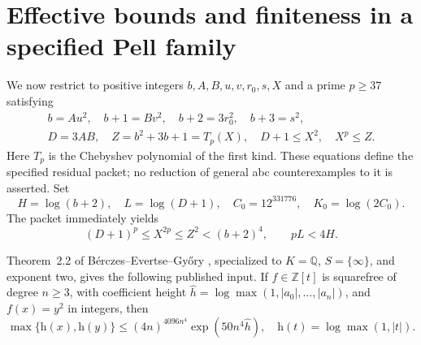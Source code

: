 \documentclass[11pt]{amsart}
\theoremstyle{definition}
\theoremstyle{remark}
\newcommand{\Q}{\mathbb Q}
\newcommand{\Z}{\mathbb Z}
\newcommand{\height}{\mathrm h}
\begin{document}
\section{Effective bounds and finiteness in a specified Pell family}\label{sec:pell}

We now restrict to positive integers $b,A,B,u,v,r_0,s,X$ and a prime
$p\ge37$ satisfying
\begin{align}
 b=Au^2,\quad b+1=Bv^2,\quad b+2=3r_0^2,\quad b+3=s^2,\label{eq:packet1}\\
 D=3AB,\quad Z=b^2+3b+1=T_p(X),\quad
 D+1\le X^2,\quad X^p\le Z.\label{eq:packet2}
\end{align}
Here $T_p$ is the Chebyshev polynomial of the first kind. These equations
define the specified residual packet; no reduction of general abc
counterexamples to it is asserted.
Set
\[
 H=\log(b+2),\quad L=\log(D+1),\quad
 C_0=12^{331776},\quad K_0=\log(2C_0).
\]
The packet immediately yields
\begin{equation}\label{eq:packetgate}
 (D+1)^p\le X^{2p}\le Z^2<(b+2)^4,\qquad pL<4H.
\end{equation}

Theorem~2.2 of B\'erczes--Evertse--Gy\H{o}ry \cite{BEG}, specialized to
$K=\Q$, $S=\{\infty\}$, and exponent two, gives the following published
input. If $f\in\Z[t]$ is squarefree of degree $n\ge3$, with coefficient
height $\widehat h=\log\max(1,|a_0|,\ldots,|a_n|)$, and $f(x)=y^2$
in integers, then
\begin{equation}\label{eq:beg}
 \max\{\height(x),\height(y)\}
 \le (4n)^{4096n^4}\exp(50n^4\widehat h),
 \quad \height(t)=\log\max(1,|t|).
\end{equation}
\end{document}
